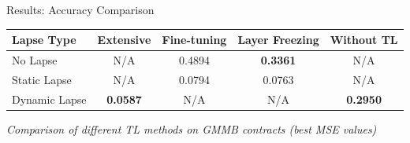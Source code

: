 \documentclass[9pt,handout]{beamer}
\begin{document}
    \begin{frame}{Results: Accuracy Comparison}
    \begin{table}
    \begin{tabular}{lcccc}
    \toprule
    \textbf{Lapse Type} & \textbf{Extensive} & \textbf{Fine-tuning} & \textbf{Layer Freezing} & \textbf{Without TL} \\
    \midrule
    No Lapse & N/A & 0.4894 & \textbf{0.3361} & N/A \\
    Static Lapse & N/A & 0.0794 & 0.0763 & N/A \\
    Dynamic Lapse & \textbf{0.0587} & N/A & N/A & \textbf{0.2950} \\
    \bottomrule
    \end{tabular}
    \end{table}
    
    \textit{Comparison of different TL methods on GMMB contracts (best MSE values)}
    \end{frame}
    
\end{document}
